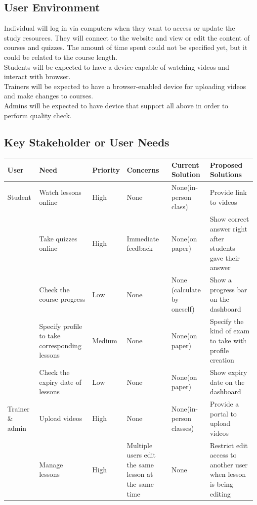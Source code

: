\documentclass[a4paper]{article}
\begin{document}
\bigskip
\subsection{User Environment}
Individual will log in via computers when they want to access or update the study resources. They will connect to the website and view or edit the content of courses and quizzes. The amount of time spent could not be specified yet, but it could be related to the course length. \\
Students will be expected to have a device capable of watching videos and interact with browser.\\
Trainers will be expected to have a browser-enabled device for uploading videos and make changes to courses. \\
Admins will be expected to have device that support all above in order to perform quality check.


\bigskip
\pagebreak
\subsection{Key Stakeholder or User Needs}
\begin{table}[!htb]
\begin{tabular}{|p{1.5cm}|p{3cm}|l|p{2cm}|p{2cm}|p{3.8cm}|}
\hline
\rowcolor{gray}
User & Need & Priority & Concerns & Current Solution & Proposed Solutions \\ \hline
Student & Watch lessons online & High & None & None(in-person class) & Provide link to videos \\ \hline
 & Take quizzes online & High & Immediate feedback & None(on paper) & Show correct answer right after students gave their answer\\ \hline
 & Check the course progress & Low & None & None (calculate by oneself) & Show a progress bar on the dashboard\\ \hline
 & Specify profile to take corresponding lessons & Medium & None & None(on paper) & Specify the kind of exam to take with profile creation \\ \hline
 & Check the expiry date of lessons & Low & None & None(on paper) & Show expiry date on the dashboard \\ \hline
Trainer \& admin & Upload videos & High & None & None(in-person classes) & Provide a portal to upload videos\\ \hline
 & Manage lessons & High & Multiple users edit the same lesson at the same time & None & Restrict edit access to another user when lesson is being editing\\
\hline
\end{tabular}
\end{table}
\end{document}
